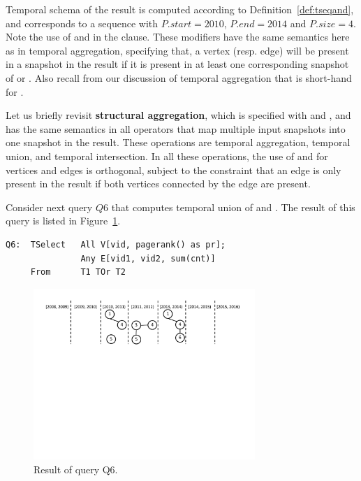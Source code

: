 Temporal schema of the result is computed according to
Definition~\ref{def:tseqand}, and corresponds to a sequence with
$P.start = 2010$, $P.end=2014$ and $P.size=4$.  Note the use of
 and  in the  clause.  These
modifiers have the same semantics here as in temporal aggregation,
specifying that, a vertex (resp. edge) will be present in a snapshot
in the result if it is present in at least one corresponding snapshot
of  or .  Also recall from our discussion of
temporal aggregation that  is short-hand
for .

Let us briefly revisit {\bf structural aggregation}, which is
specified with  and , and has the same semantics
in all \ql operators that map multiple input snapshots into one
snapshot in the result. These operations are temporal aggregation,
temporal union, and temporal intersection.  In all these operations,
the use of  and  for vertices and edges is
orthogonal, subject to the constraint that an edge is only present
in the result if both vertices connected by the edge are present.

Consider next query $Q6$ that computes temporal union of 
and .  The result of this query is listed in
Figure~\ref{fig:q6}.

\begin{verbatim}
Q6:  TSelect   All V[vid, pagerank() as pr]; 
               Any E[vid1, vid2, sum(cnt)]
     From      T1 TOr T2
\end{verbatim}

\begin{figure}
\centering
\includegraphics[width=3.3in]{figs/q6.pdf}
\caption{Result of query Q6.}
\label{fig:q6}
\end{figure}

